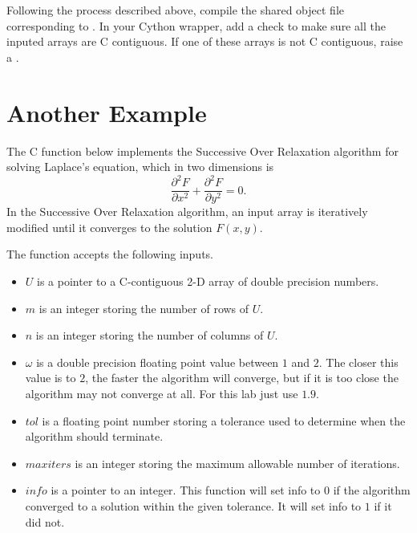 \begin{problem}
Following the process described above, compile the shared object file 
corresponding to . In your Cython wrapper, add a check to 
make sure all the inputed arrays are C contiguous. If one of these arrays
is not C contiguous, raise a .
\end{problem}


\section*{Another Example}

The C function  below implements the Successive Over Relaxation algorithm for solving Laplace's equation, which in two dimensions is
\[
\frac{\partial^2 F}{\partial x^2} + \frac{\partial^2 F}{\partial y^2} = 0.
\]
In the Successive Over Relaxation algorithm, an input array is iteratively modified until it converges to the solution $F(x,y)$.



The function  accepts the following inputs.
\begin{itemize}
\item $U$ is a pointer to a C-contiguous 2-D array of double precision numbers.
\item $m$ is an integer storing the number of rows of $U$.
\item $n$ is an integer storing the number of columns of $U$.
\item $\omega$ is a double precision floating point value between $1$ and $2$.
The closer this value is to $2$, the faster the algorithm will converge, but if it is too close the algorithm may not converge at all.
For this lab just use $1.9$.
\item $tol$ is a floating point number storing a tolerance used to determine when the algorithm should terminate.
\item $maxiters$ is an integer storing the maximum allowable number of iterations.
\item $info$ is a pointer to an integer.
This function will set info to $0$ if the algorithm converged to a solution within the given tolerance.
It will set info to $1$ if it did not.
\end{itemize}



